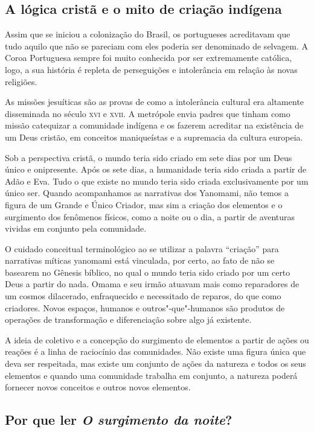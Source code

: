 \documentclass[12pt]{extarticle}
\begin{document}
\subsection{A lógica cristã e o mito de criação indígena}

Assim que se iniciou a colonização do Brasil, os portugueses acreditavam
que tudo aquilo que não se pareciam com eles poderia ser denominado de
selvagem. A Coroa Portuguesa sempre foi muito conhecida por ser
extremamente católica, logo, a sua história é repleta de perseguições e
intolerância em relação às novas religiões.

As missões jesuíticas são as provas de como a intolerância cultural era
altamente disseminada no século \textsc{xvi} e \textsc{xvii}. A metrópole envia padres que
tinham como missão catequizar a comunidade indígena e os fazerem
acreditar na existência de um Deus cristão, em conceitos maniqueístas e a
supremacia da cultura europeia.

Sob a perspectiva cristã, o mundo teria sido criado em sete dias por um Deus
único e onipresente. Após os sete dias, a humanidade teria sido criada a partir
de Adão e Eva. Tudo o que existe no mundo teria sido criada exclusivamente por
um único ser. Quando acompanhamos as narrativas dos Yanomami, não temos
a figura de um Grande e Único Criador, mas sim a criação dos elementos
e o surgimento dos fenômenos físicos, como a noite ou o dia, a partir de
aventuras vividas em conjunto pela comunidade.

O cuidado conceitual terminológico ao se utilizar a palavra “criação” para 
narrativas míticas yanomami está vinculada, por certo, ao fato de não se 
basearem no Gênesis bíblico, no qual o mundo teria sido criado por um certo 
Deus a partir do nada. Omama e seu irmão atuavam mais como reparadores de um 
cosmos dilacerado, enfraquecido e necessitado de reparos, do que como criadores. 
Novos espaços, humanos e outros"-que"-humanos são produtos de operações de 
transformação e diferenciação sobre algo já existente. 

A ideia de coletivo e a concepção do surgimento de elementos a partir de
ações ou reações é a linha de raciocínio das comunidades. Não existe uma
figura única que deva ser respeitada, mas existe um conjunto de ações da
natureza e todos os seus elementos e quando uma comunidade trabalha em
conjunto, a natureza poderá fornecer novos conceitos e outros novos
elementos.

\subsection{Por que ler \emph{O surgimento da noite}?}
\end{document}
